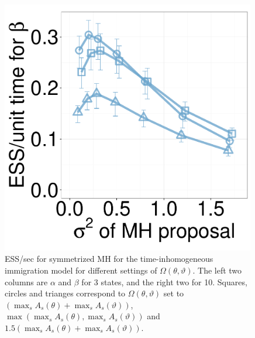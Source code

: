 \begin{figure}[H]
\begin{minipage}[hp]{0.24\linewidth}
	\end{minipage}
  \begin{minipage}[hp]{0.24\linewidth}
  \centering
    \includegraphics [width=0.99\textwidth, angle=0]{figs/new_whole_exp_figs/mh_cq_beta_dim10.pdf}
	\end{minipage}
    \caption{ESS/sec for symmetrized MH for the time-inhomogeneous immigration model for different settings of $\Omega(\theta,\vartheta)$. The left two columns are $\alpha$ and $\beta$ for 3 states, and the right two for 10. 
    Squares, circles and trianges correspond to $\Omega(\theta,\vartheta)$ set to $(\max_s A_s(\theta) + \max_s A_s(\vartheta))$, $\max(\max_s A_s(\theta), \max_s A_s(\vartheta))$ and  $1.5(\max_s A_s(\theta) + \max_s A_s(\vartheta))$.}
     \label{fig:mhESS_CQ}
  \end{figure}



